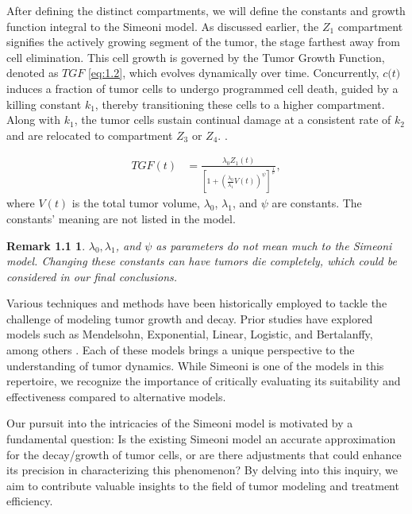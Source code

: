 \documentclass[11pt]{amsart}
\newtheorem*{remark}{Remark 1.1}
\begin{document}
After defining the distinct compartments, we will define the constants and growth function integral to the Simeoni model. As discussed earlier, the $Z_1$ compartment signifies the actively growing segment of the tumor, the stage farthest away from cell elimination. This cell growth is governed by the Tumor Growth Function, denoted as $TGF$ \ref{eq:1.2}, which evolves dynamically over time. Concurrently, $c$$($$t$$)$ induces a fraction of tumor cells to undergo programmed cell death, guided by a killing constant 
$k_1$, thereby transitioning these cells to a higher compartment. Along with $k_1$,  the tumor cells sustain continual damage at a consistent rate of $k_2$ and are relocated to compartment $Z_3$ or $Z_4$. \cite{Koziol_Falls_Schnitzer_2020}.


\begin{equation} \label{eq:1.2}
\begin{aligned}
    TGF(t) &= \frac{\lambda_0Z_1(t)}{[1 + (\frac{\lambda_0}{\lambda_1}V(t))^\psi]^\frac{1}{\psi}}, 
\end{aligned}
\tag*{(1.2)}
\end{equation}
\qquad where $V(t)$ is the total tumor volume, $\lambda_0$, $\lambda_1$, and $\psi$ are constants. The constants' meaning are not listed in the model. 

\begin{remark}
    $\lambda_0, \lambda_1$, and $\psi$ as parameters do not mean much to the Simeoni model. Changing these constants can have tumors die completely, which could be considered in our final conclusions.
\end{remark}

Various techniques and methods have been historically employed to tackle the challenge of modeling tumor growth and decay. Prior studies have explored models such as Mendelsohn, Exponential, Linear, Logistic, and Bertalanffy, among others \cite{Murphy_Hope_2016}. Each of these models brings a unique perspective to the understanding of tumor dynamics. While Simeoni is one of the models in this repertoire, we recognize the importance of critically evaluating its suitability and effectiveness compared to alternative models.

Our pursuit into the intricacies of the Simeoni model is motivated by a fundamental question: Is the existing Simeoni model an accurate approximation for the decay/growth of tumor cells, or are there adjustments that could enhance its precision in characterizing this phenomenon? By delving into this inquiry, we aim to contribute valuable insights to the field of tumor modeling and treatment efficiency.
\end{document}
